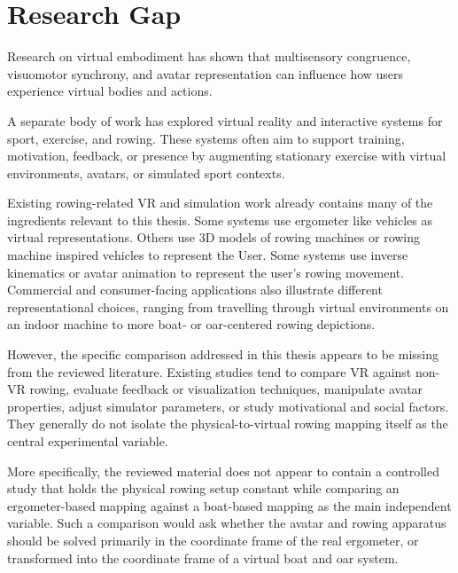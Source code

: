 \section{Research Gap}
\label{sec:introduction_research_gap}

Research on virtual embodiment has shown that multisensory congruence, visuomotor synchrony, and avatar representation can influence how users experience virtual bodies and actions.

A separate body of work has explored virtual reality and interactive systems for sport, exercise, and rowing. These systems often aim to support training, motivation, feedback, or presence by augmenting stationary exercise with virtual environments, avatars, or simulated sport contexts.

Existing rowing-related VR and simulation work already contains many of the ingredients relevant to this thesis. Some systems use ergometer like vehicles as virtual representations. Others use 3D models of rowing machines or rowing machine inspired vehicles to represent the User. Some systems use inverse kinematics or avatar animation to represent the user's rowing movement. Commercial and consumer-facing applications also illustrate different representational choices, ranging from travelling through virtual environments on an indoor machine to more boat- or oar-centered rowing depictions.

However, the specific comparison addressed in this thesis appears to be missing from the reviewed literature. Existing studies tend to compare VR against non-VR rowing, evaluate feedback or visualization techniques, manipulate avatar properties, adjust simulator parameters, or study motivational and social factors. They generally do not isolate the physical-to-virtual rowing mapping itself as the central experimental variable.

More specifically, the reviewed material does not appear to contain a controlled study that holds the physical rowing setup constant while comparing an ergometer-based mapping against a boat-based mapping as the main independent variable. Such a comparison would ask whether the avatar and rowing apparatus should be solved primarily in the coordinate frame of the real ergometer, or transformed into the coordinate frame of a virtual boat and oar system.

